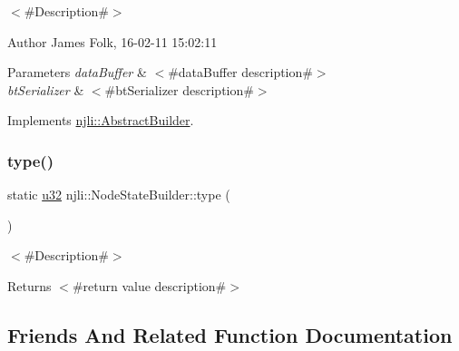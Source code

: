 $<$\#\+Description\#$>$ 

\begin{DoxyAuthor}{Author}
James Folk, 16-\/02-\/11 15\+:02\+:11
\end{DoxyAuthor}

\begin{DoxyParams}{Parameters}
{\em data\+Buffer} & $<$\#data\+Buffer description\#$>$ \\
\hline
{\em bt\+Serializer} & $<$\#bt\+Serializer description\#$>$ \\
\hline
\end{DoxyParams}


Implements \mbox{\hyperlink{classnjli_1_1_abstract_builder_ab66b774e02ccb9da554c9aab7fa6d981}{njli\+::\+Abstract\+Builder}}.

\mbox{\label{classnjli_1_1_node_state_builder_aaa3c3aab88316d8bc21c28de0c3e4ae4}} 
\subsubsection{\texorpdfstring{type()}{type()}}
{\footnotesize\ttfamily static \mbox{\hyperlink{_util_8h_a10e94b422ef0c20dcdec20d31a1f5049}{u32}} njli\+::\+Node\+State\+Builder\+::type (\begin{DoxyParamCaption}{ }\end{DoxyParamCaption})\hspace{0.3cm}{\ttfamily [static]}}

$<$\#\+Description\#$>$

\begin{DoxyReturn}{Returns}
$<$\#return value description\#$>$ 
\end{DoxyReturn}


\subsection{Friends And Related Function Documentation}
\mbox{\label{classnjli_1_1_node_state_builder_acb96ebb09abe8f2a37a915a842babfac}} 
